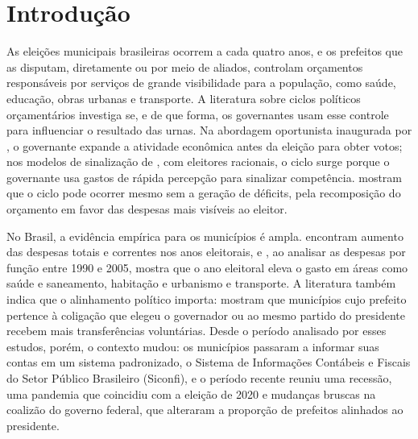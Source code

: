 \chapter{Introdução}

As eleições municipais brasileiras ocorrem a cada quatro anos, e os prefeitos que as disputam, diretamente ou por meio de aliados, controlam orçamentos responsáveis por serviços de grande visibilidade para a população, como saúde, educação, obras urbanas e transporte. A literatura sobre ciclos políticos orçamentários investiga se, e de que forma, os governantes usam esse controle para influenciar o resultado das urnas. Na abordagem oportunista inaugurada por \textcite{nordhaus1975}, o governante expande a atividade econômica antes da eleição para obter votos; nos modelos de sinalização de \textcite{rogoff1990}, com eleitores racionais, o ciclo surge porque o governante usa gastos de rápida percepção para sinalizar competência. \textcite{drazen2010} mostram que o ciclo pode ocorrer mesmo sem a geração de déficits, pela recomposição do orçamento em favor das despesas mais visíveis ao eleitor.

No Brasil, a evidência empírica para os municípios é ampla. \textcite{sakurai2011} encontram aumento das despesas totais e correntes nos anos eleitorais, e \textcite{sakurai2009}, ao analisar as despesas por função entre 1990 e 2005, mostra que o ano eleitoral eleva o gasto em áreas como saúde e saneamento, habitação e urbanismo e transporte. A literatura também indica que o alinhamento político importa: \textcite{ferreira2007} mostram que municípios cujo prefeito pertence à coligação que elegeu o governador ou ao mesmo partido do presidente recebem mais transferências voluntárias. Desde o período analisado por esses estudos, porém, o contexto mudou: os municípios passaram a informar suas contas em um sistema padronizado, o Sistema de Informações Contábeis e Fiscais do Setor Público Brasileiro (Siconfi), e o período recente reuniu uma recessão, uma pandemia que coincidiu com a eleição de 2020 e mudanças bruscas na coalizão do governo federal, que alteraram a proporção de prefeitos alinhados ao presidente.

